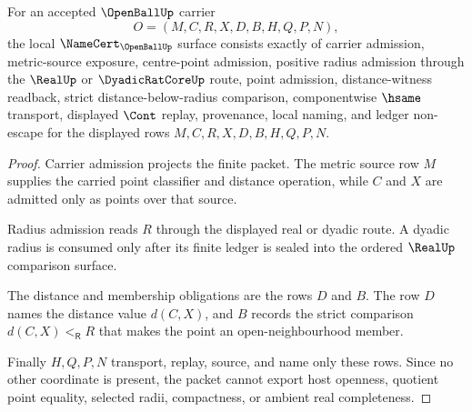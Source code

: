 \begin{theorem}
\label{thm:open-ball-namecert-obligations}
For an accepted $\OpenBallUp$ carrier
$$
O=(M,C,R,X,D,B,H,Q,P,N),
$$
the local $\NameCert_{\OpenBallUp}$ surface consists exactly of carrier admission, metric-source exposure, centre-point admission, positive radius admission through the $\RealUp$ or $\DyadicRatCoreUp$ route, point admission, distance-witness readback, strict distance-below-radius comparison, componentwise $\hsame$ transport, displayed $\Cont$ replay, provenance, local naming, and ledger non-escape for the displayed rows $M,C,R,X,D,B,H,Q,P,N$.
\end{theorem}
\begin{proof}
Carrier admission projects the finite packet. The metric source row $M$ supplies the carried point classifier and distance operation, while $C$ and $X$ are admitted only as points over that source.

Radius admission reads $R$ through the displayed real or dyadic route. A dyadic radius is consumed only after its finite ledger is sealed into the ordered $\RealUp$ comparison surface.

The distance and membership obligations are the rows $D$ and $B$. The row $D$ names the distance value $d(C,X)$, and $B$ records the strict comparison $d(C,X)<_{\mathsf R}R$ that makes the point an open-neighbourhood member.

Finally $H,Q,P,N$ transport, replay, source, and name only these rows. Since no other coordinate is present, the packet cannot export host openness, quotient point equality, selected radii, compactness, or ambient real completeness.
\end{proof}

